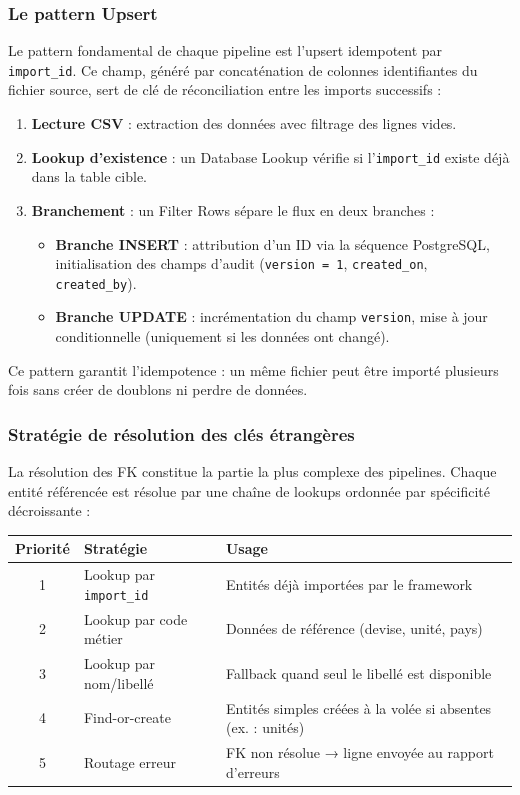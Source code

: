 \documentclass[a4paper,12pt]{article}
\begin{document}
\subsubsection{Le pattern Upsert}

Le pattern fondamental de chaque pipeline est l'upsert idempotent par \texttt{import\_id}. Ce champ, généré par concaténation de colonnes identifiantes du fichier source, sert de clé de réconciliation entre les imports successifs :

\begin{enumerate}
  \item \textbf{Lecture CSV} : extraction des données avec filtrage des lignes vides.
  \item \textbf{Lookup d'existence} : un Database Lookup vérifie si l'\texttt{import\_id} existe déjà dans la table cible.
  \item \textbf{Branchement} : un Filter Rows sépare le flux en deux branches :
  \begin{itemize}
    \item \textbf{Branche INSERT} : attribution d'un ID via la séquence PostgreSQL, initialisation des champs d'audit (\texttt{version = 1}, \texttt{created\_on}, \texttt{created\_by}).
    \item \textbf{Branche UPDATE} : incrémentation du champ \texttt{version}, mise à jour conditionnelle (uniquement si les données ont changé).
  \end{itemize}
\end{enumerate}

Ce pattern garantit l'idempotence : un même fichier peut être importé plusieurs fois sans créer de doublons ni perdre de données.

\subsubsection{Stratégie de résolution des clés étrangères}

La résolution des FK constitue la partie la plus complexe des pipelines. Chaque entité référencée est résolue par une chaîne de lookups ordonnée par spécificité décroissante :

\begin{center}
\begin{tabular}{|c|p{}|p{}|}
\hline
\textbf{Priorité} & \textbf{Stratégie} & \textbf{Usage} \\
\hline
1 & Lookup par \texttt{import\_id} & Entités déjà importées par le framework \\
\hline
2 & Lookup par code métier & Données de référence (devise, unité, pays) \\
\hline
3 & Lookup par nom/libellé & Fallback quand seul le libellé est disponible \\
\hline
4 & Find-or-create & Entités simples créées à la volée si absentes (ex. : unités) \\
\hline
5 & Routage erreur & FK non résolue → ligne envoyée au rapport d'erreurs \\
\hline
\end{tabular}
\end{center}
\end{document}
